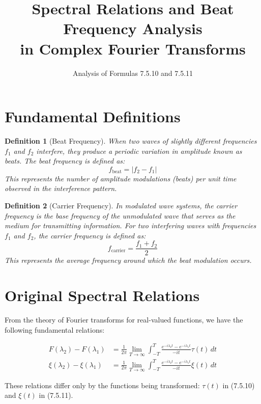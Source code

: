 \documentclass[12pt]{article}
\title{Spectral Relations and Beat Frequency Analysis\\
       in Complex Fourier Transforms}
\author{Analysis of Formulas 7.5.10 and 7.5.11}
\date{}
\newtheorem{definition}{Definition}
\begin{document}
\maketitle

\section{Fundamental Definitions}

\begin{definition}[Beat Frequency]
When two waves of slightly different frequencies $f_1$ and $f_2$ interfere, they produce a periodic variation in amplitude known as beats. The beat frequency is defined as:
\begin{equation}
f_{\text{beat}} = |f_2 - f_1|
\end{equation}
This represents the number of amplitude modulations (beats) per unit time observed in the interference pattern.
\end{definition}

\begin{definition}[Carrier Frequency]
In modulated wave systems, the carrier frequency is the base frequency of the unmodulated wave that serves as the medium for transmitting information. For two interfering waves with frequencies $f_1$ and $f_2$, the carrier frequency is defined as:
\begin{equation}
f_{\text{carrier}} = \frac{f_1 + f_2}{2}
\end{equation}
This represents the average frequency around which the beat modulation occurs.
\end{definition}

\section{Original Spectral Relations}

From the theory of Fourier transforms for real-valued functions, we have the following fundamental relations:

\begin{align}
F(\lambda_2) - F(\lambda_1) &= \frac{1}{2\pi} \lim_{T \to \infty} \int_{-T}^{T} \frac{e^{-i\lambda_2 t} - e^{-i\lambda_1 t}}{-it} \tau(t) \, dt \tag{7.5.10}\\
\xi(\lambda_2) - \xi(\lambda_1) &= \frac{1}{2\pi} \lim_{T \to \infty} \int_{-T}^{T} \frac{e^{-i\lambda_2 t} - e^{-i\lambda_1 t}}{-it} \xi(t) \, dt \tag{7.5.11}
\end{align}

These relations differ only by the functions being transformed: $\tau(t)$ in (7.5.10) and $\xi(t)$ in (7.5.11).
\end{document}
